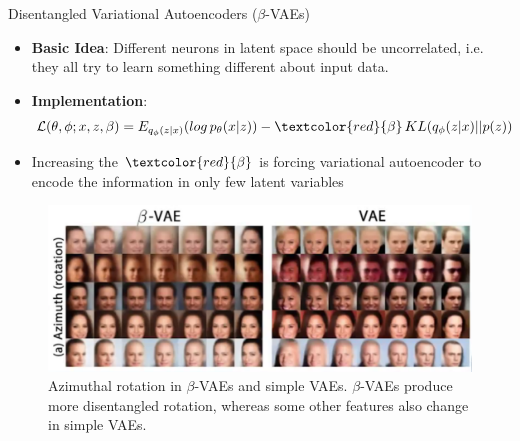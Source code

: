 \begin{frame}[allowframebreaks]{Disentangled Variational Autoencoders ($\beta$-VAEs)}
\begin{itemize}
    \item \textbf{Basic Idea}: Different neurons in latent space should be uncorrelated, i.e. they all try to learn something different about input data.
    \item \textbf{Implementation}:
    $$\mathcal{L}(\theta, \phi; x, z, \beta) = E_{q_\phi(z|x)}(log \, p_\theta(x|z)) - \textcolor{red}{\beta} \, KL(q_\phi(z|x)||p(z))$$
    \item Increasing the $\textcolor{red}{\beta}$ is forcing variational autoencoder to encode the information in only few latent variables
\end{itemize}

\framebreak

\begin{figure}
        \centering
        \includegraphics[height=0.8\textheight, width=\textwidth, keepaspectratio]{images/vae/beta-vae.png}
        \caption{Azimuthal rotation in $\beta$-VAEs and simple VAEs. $\beta$-VAEs produce more disentangled rotation, whereas some other features also change in simple VAEs.}
\end{figure}

\end{frame}

